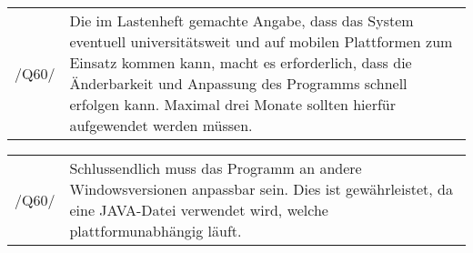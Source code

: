 \begin{tabular}{p{1.5cm}p{14.5cm}}
 /Q60/	& Die im Lastenheft gemachte Angabe, dass das System eventuell universitätsweit und auf mobilen Plattformen zum Einsatz kommen kann, macht es erforderlich, dass die Änderbarkeit und Anpassung des Programms schnell erfolgen kann. Maximal drei Monate sollten hierfür aufgewendet werden müssen. \\[0.25cm]	 
\end{tabular}
 
\begin{tabular}{p{1.5cm}p{14.5cm}}
 /Q60/	& Schlussendlich muss das Programm an andere Windowsversionen anpassbar sein. Dies ist gewährleistet, da eine JAVA-Datei verwendet wird, welche plattformunabhängig läuft. \\[0.25cm]	 
\end{tabular} 
 